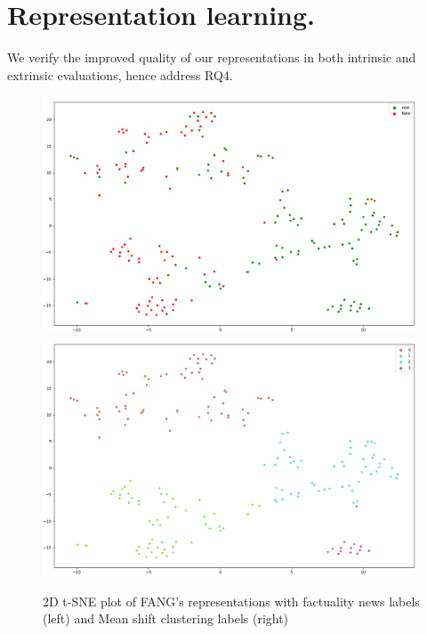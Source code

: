 \documentclass[fyp]{socreport}
\theoremstyle{definition}
\theoremstyle{hypothesis}
\begin{document}
\section{Representation learning.}
We verify the improved quality of our representations in both intrinsic and extrinsic evaluations, hence address RQ4. 

\begin{figure}[ht]
\centering
\includegraphics[scale=0.23]{fang_tsne.png}
\includegraphics[scale=0.23]{fang_clusters.png}\\
\caption{2D t-SNE plot of FANG's representations with factuality news labels (left) and Mean shift clustering labels (right)}
\label{fig:fang_rep}
\end{figure}
\end{document}
